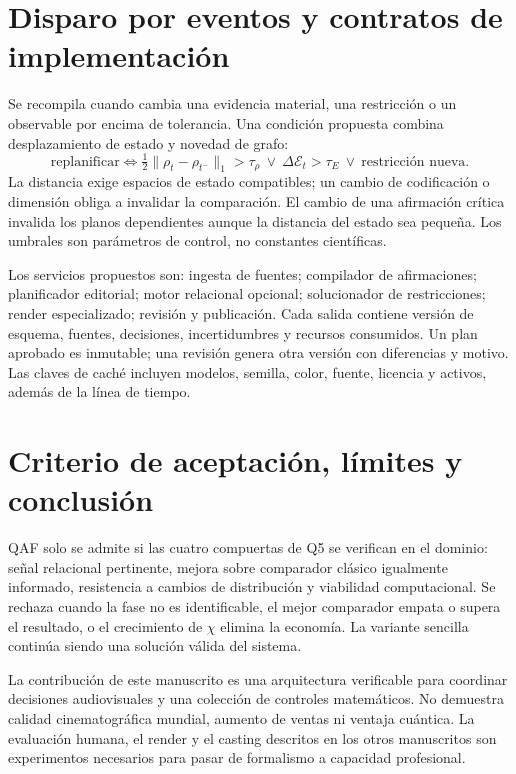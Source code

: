\section{Disparo por eventos y contratos de implementación}
Se recompila cuando cambia una evidencia material, una restricción o un observable por encima de tolerancia. Una condición propuesta combina desplazamiento de estado y novedad de grafo:
\begin{equation}
 \text{replanificar}\iff\tfrac12\|\rho_t-\rho_{t^-}\|_1>\tau_\rho\ \lor\ \Delta\mathcal E_t>\tau_E\ \lor\ \text{restricción nueva}.
\end{equation}
La distancia exige espacios de estado compatibles; un cambio de codificación o dimensión obliga a invalidar la comparación. El cambio de una afirmación crítica invalida los planos dependientes aunque la distancia del estado sea pequeña. Los umbrales son parámetros de control, no constantes científicas.

Los servicios propuestos son: ingesta de fuentes; compilador de afirmaciones; planificador editorial; motor relacional opcional; solucionador de restricciones; render especializado; revisión y publicación. Cada salida contiene versión de esquema, fuentes, decisiones, incertidumbres y recursos consumidos. Un plan aprobado es inmutable; una revisión genera otra versión con diferencias y motivo. Las claves de caché incluyen modelos, semilla, color, fuente, licencia y activos, además de la línea de tiempo.

\section{Criterio de aceptación, límites y conclusión}
QAF solo se admite si las cuatro compuertas de Q5 se verifican en el dominio: señal relacional pertinente, mejora sobre comparador clásico igualmente informado, resistencia a cambios de distribución y viabilidad computacional. Se rechaza cuando la fase no es identificable, el mejor comparador empata o supera el resultado, o el crecimiento de $\chi$ elimina la economía. La variante sencilla continúa siendo una solución válida del sistema.

La contribución de este manuscrito es una arquitectura verificable para coordinar decisiones audiovisuales y una colección de controles matemáticos. No demuestra calidad cinematográfica mundial, aumento de ventas ni ventaja cuántica. La evaluación humana, el render y el casting descritos en los otros manuscritos son experimentos necesarios para pasar de formalismo a capacidad profesional.

